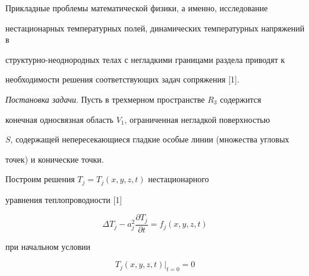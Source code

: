 \pagestyle{plain} %







\maketitle


\label{begin}








Прикладные проблемы математической физики, а именно, исследование 


нестационарных температурных полей, динамических температурных напряжений в 


структурно-неоднородных телах с негладкими границами раздела приводят к 


необходимости решения соответствующих задач сопряжения [1].





{\it Постановка задачи}. Пусть в трехмерном пространстве $R_{3}$ содержится 


конечная односвязная область $V_{1} $, ограниченная негладкой поверхностью 


$S$, содержащей непересекающиеся гладкие особые линии (множества угловых 


точек) и конические точки.





Построим решения $T_{j}=T_{j} ({x,y,z,t})$ нестационарного 


уравнения теплопроводности [1]


\begin{equation}


\label{eq1}


\Delta T_{j}-a_{j}^{2} \frac{{\partial T_{j}}}{{\partial t}}=f_{j} 


({x,y,z,t})


\end{equation}


при начальном условии


\begin{equation}


\label{eq2}


T_{j} ({x,y,z,t})|_{t=0}=0


\end{equation}


